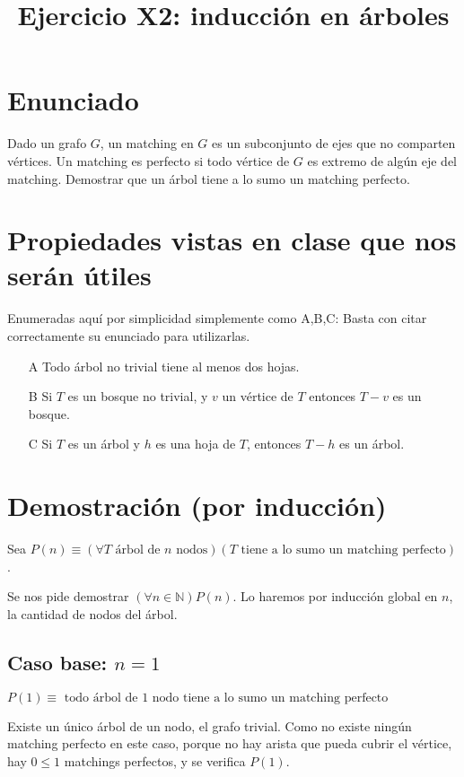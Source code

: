\documentclass{article}
\title{Ejercicio X2: inducción en árboles}
\author{}
\date{}
\begin{document}
\maketitle

\section{Enunciado}

Dado un grafo $G$, un matching en $G$ es un subconjunto de ejes que no comparten vértices. Un matching es perfecto si todo vértice de $G$ es extremo
de algún eje del matching. Demostrar que un árbol tiene a lo sumo un matching perfecto.

\section{Propiedades vistas en clase que nos serán útiles}

Enumeradas aquí por simplicidad simplemente como A,B,C: Basta con citar correctamente su enunciado para utilizarlas.

\begin{enumerate}
\item[A] Todo árbol no trivial tiene al menos dos hojas.
\item[B] Si $T$ es un bosque no trivial, y $v$ un vértice de $T$ entonces $T - v$ es un bosque.
\item[C] Si $T$ es un árbol y $h$ es una hoja de $T$, entonces $T - h$ es un árbol.
\end{enumerate}

\section{Demostración (por inducción)}

Sea $P(n) \equiv (\forall T \mbox { árbol de $n$ nodos})(T \mbox { tiene a lo sumo un matching perfecto})$.

Se nos pide demostrar $(\forall n \in \mathbb{N}) P(n)$. Lo haremos por inducción global en $n$, la cantidad de nodos del árbol.


\subsection{Caso base: $n = 1$}

$P(1) \equiv \mbox{ todo árbol de $1$ nodo tiene a lo sumo un matching perfecto}$

Existe un único árbol de un nodo, el grafo trivial. Como no existe ningún matching perfecto en este caso, porque no hay arista que pueda cubrir el vértice,
hay $0 \leq 1$ matchings perfectos, y se verifica $P(1)$.
\end{document}
